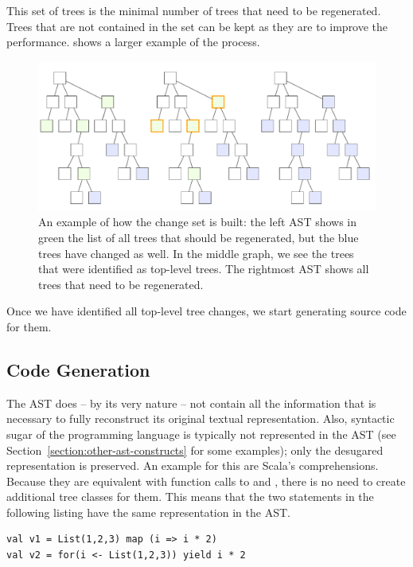 This set of trees is the minimal number of trees that need to be regenerated. Trees that are not contained in the set can be kept as they are to improve the performance.  shows a larger example of the process.

\begin{figure}
 \centering
 \includegraphics[width=\linewidth]{./ast_with_changes_large.pdf}
 \caption{An example of how the change set is built: the left AST shows in green the list of all trees that should be regenerated, but the blue trees have changed as well. In the middle graph, we see the trees that were identified as top-level trees. The rightmost AST shows all trees that need to be regenerated.}
 \label{figure:ast_with_changes_large}
\end{figure}

Once we have identified all top-level tree changes, we start generating source code for them. 

\subsection{Code Generation}

The AST does -- by its very nature -- not contain all the information that is necessary to fully reconstruct its original textual representation. Also, syntactic sugar of the programming language is typically not represented in the AST (see Section~\vref{section:other-ast-constructs} for some examples); only the desugared representation is preserved. An example for this are Scala's  comprehensions. Because they are equivalent with function calls to  and , there is no need to create additional tree classes for them. This means that the two statements in the following listing have the same representation in the AST.

\begin{lstlisting}
val v1 = List(1,2,3) map (i => i * 2)
val v2 = for(i <- List(1,2,3)) yield i * 2
\end{lstlisting}

